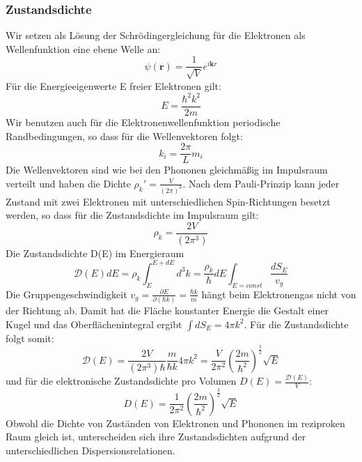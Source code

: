\documentclass[11pt]{article}
\begin{document}
\subsubsection{Zustandsdichte}
Wir setzen als Lösung der Schrödingergleichung für die Elektronen als
Wellenfunktion eine ebene Welle an:
\begin{equation}
  \psi(\bm{r})=\frac{1}{\sqrt{V}}e^{i\bm{k}{r}}
\end{equation}
Für die Energieeigenwerte E freier Elektronen gilt:
\begin{equation}
  E=\frac{\hbar^2k^2}{2m}
\end{equation}
Wir benutzen auch für die Elektronenwellenfunktion periodische Randbedingungen,
so dass für die Wellenvektoren folgt:
\begin{equation}
  k_i=\frac{2\pi}{L}m_i
\end{equation}
Die Wellenvektoren sind wie bei den Phononen gleichmäßig im Impulsraum verteilt
und haben die Dichte $\rho_k'=\frac{V}{(2\pi)^3}$. Nach dem Pauli-Prinzip kann
jeder Zustand mit zwei Elektronen mit unterschiedlichen Spin-Richtungen besetzt
werden, so dass für die Zustandsdichte im Impulsraum gilt:
\begin{equation}
  \rho_k=\frac{2V}{(2\pi^3)}
\end{equation}
Die Zustandsdichte D(E) im Energieraum
\begin{equation}
  \mathcal{D}(E)dE=\rho_k\int_E^{E+dE}d^3k=\frac{\rho_k}{\hbar}dE\int_{E=const}
  \frac{dS_E}{v_g}
\end{equation}
Die Gruppengeschwindigkeit $v_g=\frac{\partial E}{\partial (\hbar k)}=\frac
{\hbar k}{m}$ hängt beim Elektronengas nicht von der Richtung ab. Damit hat die
Fläche konstanter Energie die Gestalt einer Kugel und das Oberflächenintegral
ergibt $\int dS_E=4\pi k^2$. Für die Zustandsdichte folgt somit:
\begin{equation}
  \mathcal{D}(E)=\frac{2V}{(2\pi^3)\hbar}\frac{m}{\hbar k}4\pi k^2=
  \frac{V}{2\pi^2}\left( \frac{2m}{\hbar^2} \right)^{\frac{3}{2}}\sqrt{E}
\end{equation}
und für die elektronische Zustandsdichte pro Volumen $D(E)=\frac{\mathcal{D}
(E)}{V}$:
\begin{equation}
  D(E)=\frac{1}{2\pi^2}\left( \frac{2m}{\hbar^2}\right)^{\frac{3}{2}}\sqrt{E}
\end{equation}
Obwohl die Dichte von Zuständen von Elektronen und Phononen im reziproken
Raum gleich ist, unterscheiden sich ihre Zustandsdichten aufgrund der
unterschiedlichen Dispersionsrelationen.
\end{document}
